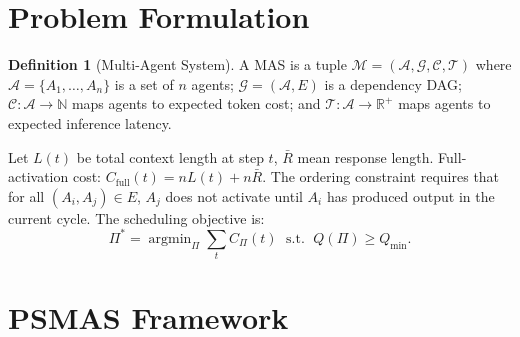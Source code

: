 \documentclass[10pt,twocolumn]{article}
\theoremstyle{plain}
\theoremstyle{definition}
\newtheorem{definition}[theorem]{Definition}
\theoremstyle{remark}
\newcommand{\A}{\mathcal{A}}
\newcommand{\G}{\mathcal{G}}
\newcommand{\M}{\mathcal{M}}
\newcommand{\Ccost}{\mathcal{C}}
\newcommand{\T}{\mathcal{T}}
\newcommand{\R}{\mathbb{R}}
\newcommand{\N}{\mathbb{N}}
\begin{document}
\section{Problem Formulation}
\label{sec:problem}

\begin{definition}[Multi-Agent System]
A MAS is a tuple $\M=(\A,\G,\Ccost,\T)$ where $\A=\{A_1,\ldots,A_n\}$
is a set of $n$ agents; $\G=(\A,E)$ is a dependency DAG;
$\Ccost:\A\to\N$ maps agents to expected token cost; and
$\T:\A\to\R^+$ maps agents to expected inference latency.
\end{definition}

Let $L(t)$ be total context length at step $t$, $\bar{R}$ mean response
length.  Full-activation cost: $C_{\mathrm{full}}(t)=n L(t)+n\bar{R}$.
The ordering constraint requires that for all $(A_i,A_j)\in E$,
$A_j$ does not activate until $A_i$ has produced output in the current
cycle.  The scheduling objective is:
\begin{equation}
  \Pi^*=\operatorname{argmin}_\Pi\textstyle\sum_t C_\Pi(t)
  \;\text{ s.t. }\; Q(\Pi)\geq Q_{\min}.
  \label{eq:objective}
\end{equation}

\section{PSMAS Framework}
\label{sec:method}
\end{document}
